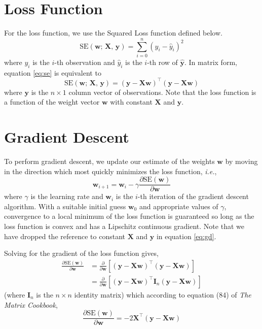 \documentclass{article}
\begin{document}
\section{Loss Function}
For the loss function, we use the Squared Loss function defined below.
\begin{equation}
    \mathrm{SE}(\mathbf{w};\,\mathbf{X},\,\mathbf{y}) = \sum_{i=0}^n \left(y_i - \hat{y}_i\right)^2
    \label{eq:se}
\end{equation}
where $y_i$ is the $i$-th observation and $\hat{y}_i$ is the $i$-th row of $\hat{\mathbf{y}}$.  In matrix form, equation \eqref{eq:se} is equivalent to
\begin{equation}
    \mathrm{SE}(\mathbf{w};\,\mathbf{X},\,\mathbf{y}) = (\mathbf{y} - \mathbf{X}\mathbf{w})^\top (\mathbf{y} - \mathbf{X}\mathbf{w})
\end{equation}
where $\mathbf{y}$ is the $n\times 1$ column vector of observations.  Note that the loss function is a function of the weight vector $\mathbf{w}$ with constant $\mathbf{X}$ and $\mathbf{y}$.

\section{Gradient Descent}
To perform gradient descent, we update our estimate of the weights $\mathbf{w}$ by moving in the direction which most quickly minimizes the loss function, \textit{i.e.},
\begin{equation}
    \mathbf{w}_{i+1} = \mathbf{w}_i - \gamma\frac{\partial\mathrm{SE}(\mathbf{w})}{\partial\mathbf{w}}
    \label{eq:gd}
\end{equation}
where $\gamma$ is the learning rate and $\mathbf{w}_i$ is the $i$-th iteration of the gradient descent algorithm.  With a suitable initial guess $\mathbf{w}_0$ and appropriate values of $\gamma$, convergence to a local minimum of the loss function is guaranteed so long as the loss function is convex and has a Lipschitz continuous gradient.  Note that we have dropped the reference to constant $\mathbf{X}$ and $\mathbf{y}$ in equation \eqref{eq:gd}.

Solving for the gradient of the loss function gives,
\begin{align}
    \frac{\partial\mathrm{SE}(\mathbf{w})}{\partial\mathbf{w}} &= \frac{\partial}{\partial {\mathbf{w}}} \left[(\mathbf{y} - \mathbf{X}\mathbf{w})^\top (\mathbf{y} - \mathbf{X}\mathbf{w})\right] \\
    & = \frac{\partial}{\partial \mathbf{w}}\left[(\mathbf{y} - \mathbf{X}\mathbf{w})^\top\mathbf{I}_n(\mathbf{y} - \mathbf{X}\mathbf{w})\right]
\end{align}
(where $\mathbf{I}_n$ is the $n\times n$ identity matrix) which according to equation (84) of \textit{The Matrix Cookbook},
\begin{equation}
    \frac{\partial\mathrm{SE}(\mathbf{w})}{\partial\mathbf{w}} = -2\mathbf{X}^\top(\mathbf{y} - \mathbf{X}\mathbf{w})
    \label{eq:lin_reg_gd}
\end{equation}
\end{document}
